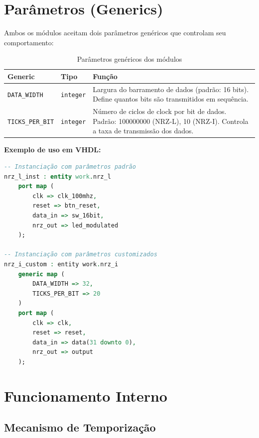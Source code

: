 \documentclass[11pt,a4paper]{article}
\begin{document}
\section{Parâmetros (Generics)}

Ambos os módulos aceitam dois parâmetros genéricos que controlam seu comportamento:

\begin{table}[H]
\centering
\begin{tabularx}{\textwidth}{|l|l|X|}
\hline
\textbf{Generic} & \textbf{Tipo} & \textbf{Função} \\
\hline
\texttt{DATA\_WIDTH} & \texttt{integer} & Largura do barramento de dados (padrão: 16 bits). Define quantos bits são transmitidos em sequência. \\
\hline
\texttt{TICKS\_PER\_BIT} & \texttt{integer} & Número de ciclos de clock por bit de dados. Padrão: 100000000 (NRZ-L), 10 (NRZ-I). Controla a taxa de transmissão dos dados. \\
\hline
\end{tabularx}
\caption{Parâmetros genéricos dos módulos}
\end{table}

\textbf{Exemplo de uso em VHDL:}

\begin{lstlisting}[language=VHDL]
-- Instanciação com parâmetros padrão
nrz_l_inst : entity work.nrz_l
    port map (
        clk => clk_100mhz,
        reset => btn_reset,
        data_in => sw_16bit,
        nrz_out => led_modulated
    );

-- Instanciação com parâmetros customizados
nrz_i_custom : entity work.nrz_i
    generic map (
        DATA_WIDTH => 32,
        TICKS_PER_BIT => 20
    )
    port map (
        clk => clk,
        reset => reset,
        data_in => data(31 downto 0),
        nrz_out => output
    );
\end{lstlisting}

\section{Funcionamento Interno}

\subsection{Mecanismo de Temporização}
\end{document}
